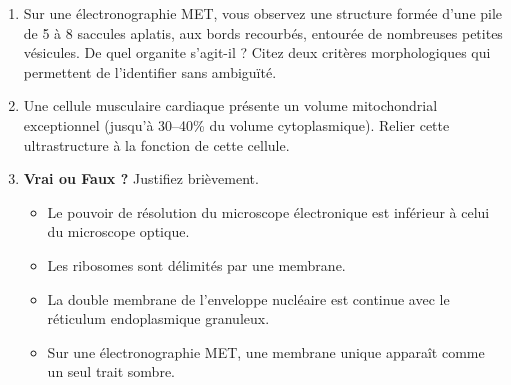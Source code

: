 \documentclass[11pt]{article}
\begin{document}
\begin{exercice}
\begin{enumerate}
    \item Sur une électronographie MET, vous observez une structure formée d'une pile de 5 à 8 saccules aplatis, aux bords recourbés, entourée de nombreuses petites vésicules. De quel organite s'agit-il ? Citez deux critères morphologiques qui permettent de l'identifier sans ambiguïté.
    \item Une cellule musculaire cardiaque présente un volume mitochondrial exceptionnel (jusqu'à 30--40\% du volume cytoplasmique). Relier cette ultrastructure à la fonction de cette cellule.
    \item \textbf{Vrai ou Faux ?} Justifiez brièvement.
    \begin{itemize}
        \item[a)] Le pouvoir de résolution du microscope électronique est inférieur à celui du microscope optique.
        \item[b)] Les ribosomes sont délimités par une membrane.
        \item[c)] La double membrane de l'enveloppe nucléaire est continue avec le réticulum endoplasmique granuleux.
        \item[d)] Sur une électronographie MET, une membrane unique apparaît comme un seul trait sombre.
    \end{itemize}
\end{enumerate}
\end{exercice}
\end{document}
